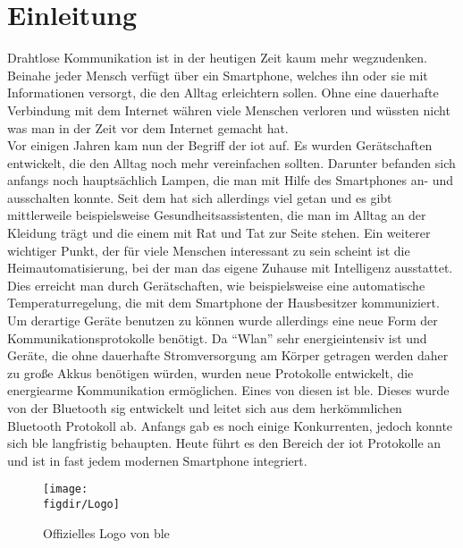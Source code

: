 \section{Einleitung}
\label{s:intro}

Drahtlose Kommunikation ist in der heutigen Zeit kaum mehr wegzudenken. Beinahe jeder Mensch verfügt über ein Smartphone, welches ihn oder sie mit Informationen versorgt, die den Alltag erleichtern sollen. Ohne eine dauerhafte Verbindung mit dem Internet währen viele Menschen verloren und wüssten nicht was man in der Zeit vor dem Internet gemacht hat.\\

\noindent Vor einigen Jahren kam nun der Begriff der \ac{iot} auf. Es wurden Gerätschaften entwickelt, die den Alltag noch mehr vereinfachen sollten. Darunter befanden sich anfangs noch hauptsächlich Lampen, die man mit Hilfe des Smartphones an- und ausschalten konnte. Seit dem hat sich allerdings viel getan und es gibt mittlerweile beispielsweise Gesundheitsassistenten, die man im Alltag an der Kleidung trägt und die einem mit Rat und Tat zur Seite stehen. Ein weiterer wichtiger Punkt, der für viele Menschen interessant zu sein scheint ist die Heimautomatisierung, bei der man das eigene Zuhause mit Intelligenz ausstattet. Dies erreicht man durch Gerätschaften, wie beispielsweise eine automatische Temperaturregelung, die mit dem Smartphone der Hausbesitzer kommuniziert.\\

\noindent Um derartige Geräte benutzen zu können wurde allerdings eine neue Form der Kommunikationsprotokolle benötigt. Da "`Wlan"' sehr energieintensiv ist und Geräte, die ohne dauerhafte Stromversorgung am Körper getragen werden daher zu große Akkus benötigen würden, wurden neue Protokolle entwickelt, die energiearme Kommunikation ermöglichen. Eines von diesen ist \ac{ble}. Dieses wurde von der Bluetooth \ac{sig} entwickelt und leitet sich aus dem herkömmlichen Bluetooth Protokoll ab. Anfangs gab es noch einige Konkurrenten, jedoch konnte sich \ac{ble} langfristig behaupten. Heute führt es den Bereich der \ac{iot} Protokolle an und ist in fast jedem modernen Smartphone integriert.\\

\begin{figure}[h]
	\centering
	\texttt{[image: \\figdir/Logo]}
	\caption{Offizielles Logo von \ac{ble} \cite{BLE:WWW}}
	\label{FIG:logo}
\end{figure}

